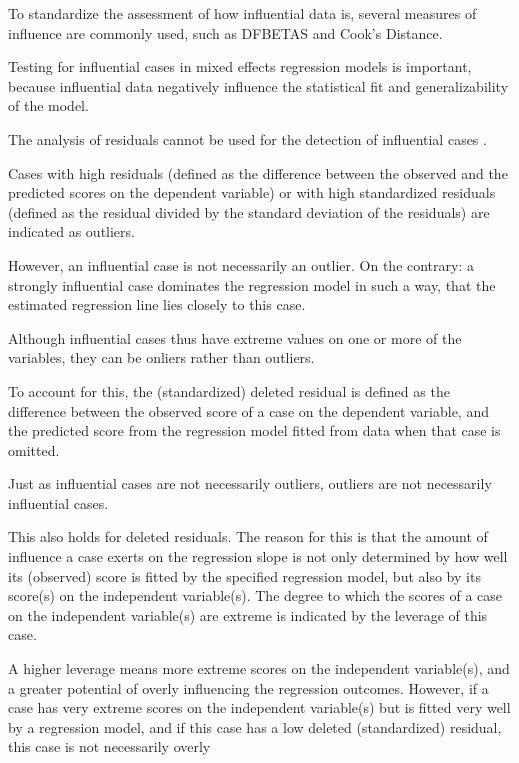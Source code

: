 To standardize the assessment of how influential data is, several measures of influence are commonly used, such as DFBETAS 
and Cook’s Distance.

Testing for influential cases in mixed effects regression models is important, because influential data negatively 
influence the statistical fit and generalizability of the model.


The analysis of residuals cannot be used for the detection of influential cases \citep{crawley2012r}. 

Cases with high residuals (defined as the difference between the observed and the predicted scores on the dependent
variable) or with high standardized residuals (defined as the residual divided by the standard deviation
of the residuals) are indicated as outliers.

However, an influential case is not necessarily an outlier. On the contrary: a strongly influential case dominates
the regression model in such a way, that the estimated regression line lies closely to this case. 


Although influential cases thus have extreme values on one or more of the variables, they can be onliers
rather than outliers. 

To account for this, the (standardized) deleted residual is defined as the difference between
the observed score of a case on the dependent variable, and the predicted score from the regression
model fitted from data when that case is omitted.


Just as influential cases are not necessarily outliers, outliers are not necessarily influential cases. 

This also holds for deleted residuals. The reason for this is that the amount of influence a case exerts on the regression slope is not only determined by how well its (observed) score is fitted by the specified
regression model, but also by its score(s) on the independent variable(s). The degree to which the scores of a case on the independent variable(s) are extreme is indicated by the leverage of this case. 

A higher leverage means more extreme scores on the independent variable(s), and a greater potential of
overly influencing the regression outcomes. However, if a case has very extreme scores on the independent
variable(s) but is fitted very well by a regression model, and if this case has a low deleted (standardized)
residual, this case is not necessarily overly


